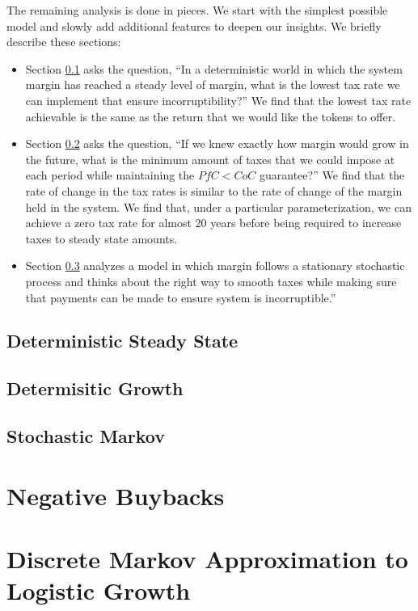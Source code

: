 \documentclass[12pt]{article}
\begin{document}
  The remaining analysis is done in pieces. We start with the simplest possible model and slowly
  add additional features to deepen our insights. We briefly describe these sections:

  \begin{itemize}
    \item Section \ref{sec:dss} asks the question, ``In a deterministic world in which the system
          margin has reached a steady level of margin, what is the lowest tax rate we can implement
          that ensure incorruptibility?'' We find that the lowest tax rate achievable is the same
          as the return that we would like the tokens to offer.
    \item Section \ref{sec:dg} asks the question, ``If we knew exactly how margin would grow
          in the future, what is the minimum amount of taxes that we could impose at each
          period while maintaining the $PfC < CoC$ guarantee?'' We find that the rate of change in
          the tax rates is similar to the rate of change of the margin held in the system. We find
          that, under a particular parameterization, we can achieve a zero tax rate for almost 20
          years before being required to increase taxes to steady state amounts.
    \item Section \ref{sec:sm} analyzes a model in which margin follows a stationary stochastic
          process and thinks about the right way to smooth taxes while making sure that payments
          can be made to ensure system is incorruptible.''
  \end{itemize}

  \subsection{Deterministic Steady State} \label{sec:dss}
    

  \subsection{Determisitic Growth} \label{sec:dg}
    

  \subsection{Stochastic Markov} \label{sec:sm}
    

\appendix

\section{Negative Buybacks} \label{app:nbb}
  

\section{Discrete Markov Approximation to Logistic Growth} \label{app:dmc}
  
\end{document}
